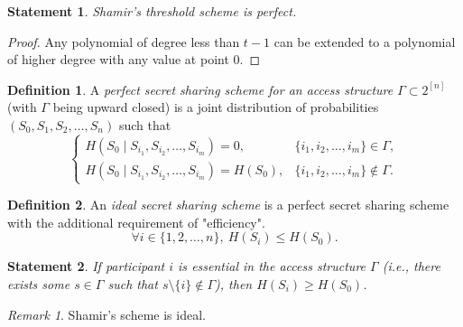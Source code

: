 \documentclass[12pt,sans]{article}
\newcommand{\seqn}[2]{{#1}_1,{#1}_2,\dotsc,{#1}_{#2}}
\newcommand{\seqin}[3]{{#1}_{{#2}_1},{#1}_{{#2}_2},\dotsc,{#1}_{{#2}_{#3}}}
\theoremstyle{definition}
\newtheorem{definition}{Definition}[section]
\theoremstyle{plain}
\newtheorem{statement}{Statement}[section]
\theoremstyle{remark}
\newtheorem{remark}{Remark}[section]
\begin{document}
\begin{statement}
    Shamir's threshold scheme is perfect.
\end{statement}
\begin{proof}
    Any polynomial of degree less than $t-1$ can be extended to a polynomial of higher degree with any value at point $0$.
\end{proof}

\begin{definition}
    A \emph{perfect secret sharing scheme for an access structure $\Gamma \subset 2^{[n]}$} (with $\Gamma$ being upward closed) is a joint distribution of probabilities $(S_0, \seqn{S}{n})$ such that
    \[
    \begin{cases}
        H(S_0 \mid \seqin{S}{i}{m}) = 0, & \{\seqn{i}{m}\} \in \Gamma,\\
        H(S_0 \mid \seqin{S}{i}{m}) = H(S_0), & \{\seqn{i}{m}\} \not\in \Gamma.
    \end{cases}
    \]
\end{definition}

\begin{definition}
    An \emph{ideal secret sharing scheme} is a perfect secret sharing scheme with the additional requirement of "efficiency".
    \[
    \forall i \in \{1, 2, \dotsc, n\},\ H(S_i) \le H(S_0).
    \]
\end{definition}

\begin{statement}
    If participant $i$ is \emph{essential} in the access structure $\Gamma$ (i.e., there exists
    some $s \in \Gamma$ such that $s \setminus \{i\} \not\in \Gamma$), then $H(S_i) \ge H(S_0)$.
\end{statement}

\begin{remark}
    Shamir's scheme is ideal.
\end{remark}
\end{document}
